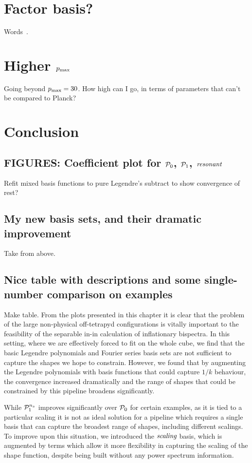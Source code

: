 \section{Factor basis?}
    Words~\cite{tensor_decomp_review}.
\section{Higher $p_\text{max}$}
    Going beyond $p_\text{max}=30$.
    How high can I go, in terms of parameters that can't be compared to Planck?
\section{Conclusion}
    \subsection{FIGURES: Coefficient plot for $\mathcal{P}_0$, $\mathcal{P}_1$, $\textit{resonant}$}
    Refit mixed basis functions to pure Legendre's subtract to show convergence of rest?
    \subsection{My new basis sets, and their dramatic improvement}
    Take from above.
    \subsection{Nice table with descriptions and some single-number comparison on examples}
    Make table.
    From the plots presented in this chapter it is clear that the problem of the
    large non-physical off-tetrapyd configurations is vitally important to the feasibility of the
    separable in-in calculation of inflationary bispectra.
    In this setting, where we are effectively forced to fit on the whole cube,
    we find that the basic Legendre polynomials and Fourier series basis sets
    are not sufficient to capture the shapes we hope to constrain.
    However, we found that by augmenting the Legendre polynomials with
    basis functions that could capture $1/k$ behaviour, the convergence
    increased dramatically and the range of shapes that could be constrained by
    this pipeline broadens significantly.


    While $\mathcal{P}^{n_s}_1$ improves significantly over $\mathcal{P}_0$ for certain examples,
    as it is tied to a particular scaling it is not as ideal solution for a pipeline which requires
    a single basis that can capture the broadest range of shapes, including different scalings.
    To improve upon this situation, we introduced the $\textit{scaling}$ basis, which is augmented by
    terms which allow it more flexibility in capturing the scaling of the shape function,
    despite being built without any power spectrum information.

